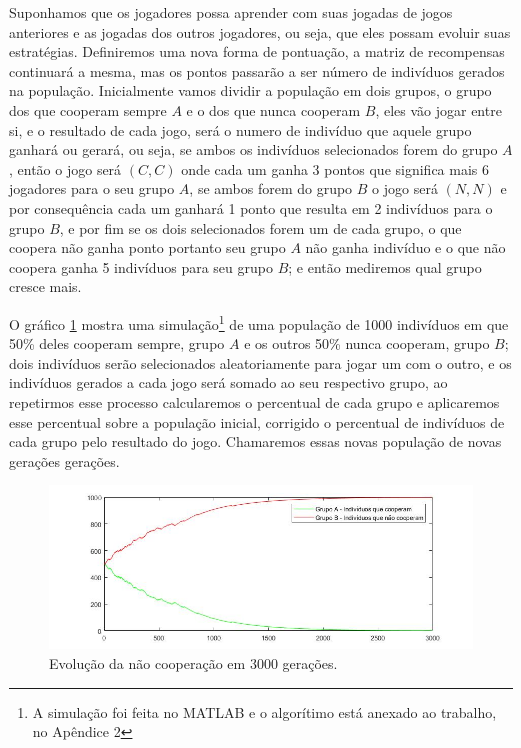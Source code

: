 Suponhamos que os jogadores possa aprender com suas jogadas de jogos anteriores e as jogadas dos outros jogadores, ou seja, que eles possam evoluir suas estratégias. Definiremos uma nova forma de pontuação, a matriz de recompensas continuará a mesma, mas os pontos passarão a ser número de indivíduos gerados na população. Inicialmente vamos dividir a população em dois grupos, o grupo dos que cooperam sempre $A$ e o dos que nunca cooperam $B$, eles vão jogar entre si, e o resultado de cada jogo, será o numero de indivíduo que aquele grupo ganhará ou gerará, ou seja, se ambos os indivíduos selecionados forem do grupo $A$, então o jogo será $(C,C)$ onde cada um ganha 3 pontos que significa mais 6 jogadores para o seu grupo $A$, se ambos forem do grupo $B$ o jogo será $(N,N)$ e por consequência cada um ganhará 1 ponto que resulta em 2 indivíduos para o grupo $B$, e por fim se os dois selecionados forem um de cada grupo, o que coopera não ganha ponto portanto seu grupo $A$ não ganha indivíduo e o que não coopera ganha 5 indivíduos para seu grupo $B$; e então mediremos qual grupo cresce mais.

O gráfico \ref{fig9} mostra uma simulação\footnote{A simulação foi feita no MATLAB e o algorítimo está anexado ao trabalho, no Apêndice 2} de uma população de 1000 indivíduos em que 50\% deles cooperam sempre, grupo $A$ e os outros 50\% nunca cooperam, grupo $B$; dois indivíduos serão selecionados aleatoriamente para jogar um com o outro, e os indivíduos gerados a cada jogo será somado ao seu respectivo grupo, ao repetirmos esse processo calcularemos o percentual de cada grupo e aplicaremos esse percentual sobre a população inicial, corrigido o percentual de indivíduos de cada grupo pelo resultado do jogo. Chamaremos essas novas população de novas gerações gerações.

\begin{figure}[H]
\centering
\includegraphics[width=14cm]{imagens/graf9.jpg}
\caption{Evolução da não cooperação em 3000 gerações.}
\label{fig9}
\end{figure}

